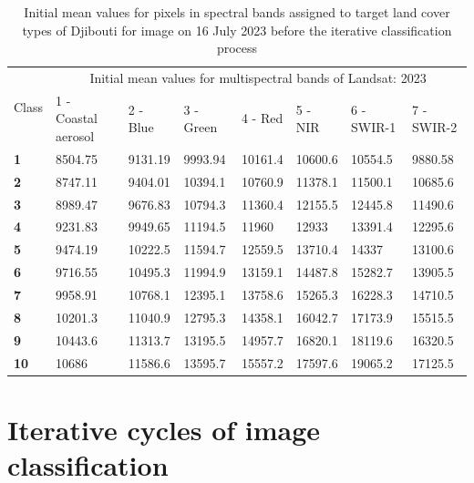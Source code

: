 \documentclass[jimaging,article,submit,pdftex,moreauthors]{Definitions/mdpi}
\begin{document}
\begin{table}[H]
  \centering
  \begin{tabularx}{\textwidth}{p{0.7cm}p{2.5cm}p{1.0cm}p{1.3cm}p{1.0cm}p{1.0cm}p{1.5cm}p{1.5cm}}
  \toprule
  \multirow{2}{*}{Class} & \multicolumn{7}{c}{Initial mean values for multispectral bands of Landsat: 2023} \\
     & 1 - Coastal aerosol & 2 - Blue & 3 - Green & 4 - Red & 5 - NIR & 6 - SWIR-1 & 7 - SWIR-2 \\
    \midrule
    \textbf{1} & 8504.75 & 9131.19 & 9993.94 & 10161.4 & 10600.6 & 10554.5 & 9880.58 \\
    \textbf{2} & 8747.11 & 9404.01 & 10394.1 & 10760.9 & 11378.1 & 11500.1 & 10685.6 \\
    \textbf{3} & 8989.47 & 9676.83 & 10794.3 & 11360.4 & 12155.5 & 12445.8 & 11490.6 \\
    \textbf{4} & 9231.83 & 9949.65 & 11194.5 & 11960 & 12933 & 13391.4 & 12295.6 \\
    \textbf{5} & 9474.19 & 10222.5 & 11594.7 & 12559.5 & 13710.4 & 14337 & 13100.6 \\
    \textbf{6} & 9716.55 & 10495.3 & 11994.9 & 13159.1 & 14487.8 & 15282.7 & 13905.5 \\
    \textbf{7} & 9958.91 & 10768.1 & 12395.1 & 13758.6 & 15265.3 & 16228.3 & 14710.5 \\
    \textbf{8} & 10201.3 & 11040.9 & 12795.3 & 14358.1 & 16042.7 &17173.9 & 15515.5 \\
    \textbf{9} & 10443.6 & 11313.7 & 13195.5 & 14957.7 & 16820.1 & 18119.6 & 16320.5 \\
    \textbf{10} & 10686 & 11586.6 & 13595.7 & 15557.2 & 17597.6 & 19065.2 & 17125.5 \\
\bottomrule
\end{tabularx}
  \caption{Initial mean values for pixels in spectral bands assigned to target land cover types of Djibouti for image on 16 July 2023 before the iterative classification process}
  \label{tabA4} 
\end{table}

\section[\appendixname~\thesection]{Iterative cycles of image classification}\label{AppB}
\end{document}
